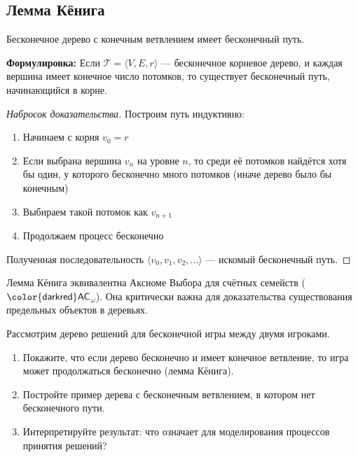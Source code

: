 \documentclass[11pt, a4paper]{extarticle}
\newcommand{\om}{\omega}
\newcommand{\Tcal}{{\mathcal T}}
\newcommand{\AC}{\ifmmode \mathsf{\color{darkred}AC}\else ${\mathsf{\color{darkred}AC}}$\fi\xspace}
\begin{document}
\subsection{Лемма Кёнига}

\begin{theorem}
Бесконечное дерево с конечным ветвлением имеет бесконечный путь.

\textbf{Формулировка:} Если $\Tcal = \langle V, E, r \rangle$ --- бесконечное корневое дерево, и каждая вершина имеет конечное число потомков, то существует бесконечный путь, начинающийся в корне.
\end{theorem}

\begin{proof}[Набросок доказательства]
Построим путь индуктивно:
\begin{enumerate}
    \item Начинаем с корня $v_0 = r$
    \item Если выбрана вершина $v_n$ на уровне $n$, то среди её потомков найдётся хотя бы один, у которого бесконечно много потомков (иначе дерево было бы конечным)
    \item Выбираем такой потомок как $v_{n+1}$
    \item Продолжаем процесс бесконечно
\end{enumerate}
Полученная последовательность $\langle v_0, v_1, v_2, \ldots \rangle$ --- искомый бесконечный путь.
\end{proof}

\begin{remark}
Лемма Кёнига эквивалентна Аксиоме Выбора для счётных семейств (\AC$_\om$). Она критически важна для доказательства существования предельных объектов в деревьях.
\end{remark}

\begin{exercise}
Рассмотрим дерево решений для бесконечной игры между двумя игроками.
\begin{enumerate}
    \item Покажите, что если дерево бесконечно и имеет конечное ветвление, то игра может продолжаться бесконечно (лемма Кёнига).
    \item Постройте пример дерева с бесконечным ветвлением, в котором нет бесконечного пути.
    \item Интерпретируйте результат: что означает для моделирования процессов принятия решений?
\end{enumerate}
\end{exercise}
\end{document}
